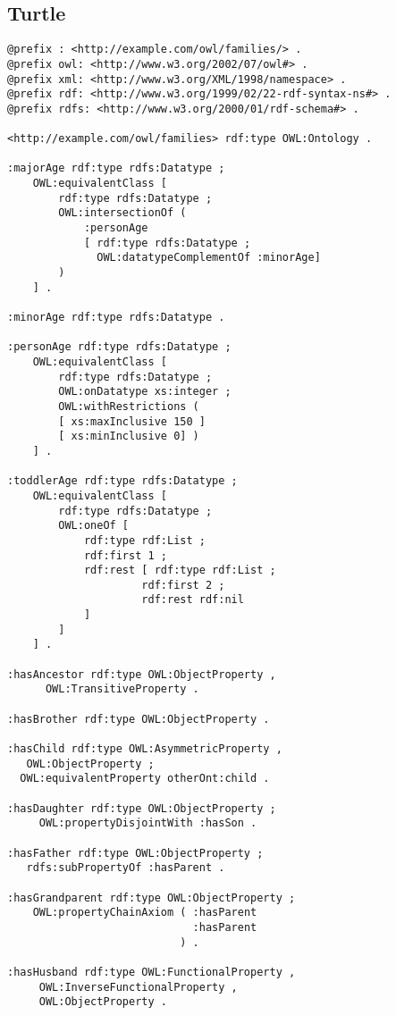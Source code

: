\documentclass[11pt,a4paper,final,oneside,onecolumn]{article}
\begin{document}
	\subsection{Turtle}
	
	
	\begin{lstlisting}[language=Turtle]
@prefix : <http://example.com/owl/families/> .
@prefix owl: <http://www.w3.org/2002/07/owl#> .
@prefix xml: <http://www.w3.org/XML/1998/namespace> .
@prefix rdf: <http://www.w3.org/1999/02/22-rdf-syntax-ns#> .
@prefix rdfs: <http://www.w3.org/2000/01/rdf-schema#> .

<http://example.com/owl/families> rdf:type OWL:Ontology .

:majorAge rdf:type rdfs:Datatype ;
    OWL:equivalentClass [ 
        rdf:type rdfs:Datatype ;
        OWL:intersectionOf ( 
            :personAge
            [ rdf:type rdfs:Datatype ;
              OWL:datatypeComplementOf :minorAge]
        )
    ] .

:minorAge rdf:type rdfs:Datatype .

:personAge rdf:type rdfs:Datatype ;
    OWL:equivalentClass [ 
        rdf:type rdfs:Datatype ;
        OWL:onDatatype xs:integer ;
        OWL:withRestrictions ( 
        [ xs:maxInclusive 150 ]
        [ xs:minInclusive 0] )
    ] .

:toddlerAge rdf:type rdfs:Datatype ;
    OWL:equivalentClass [ 
        rdf:type rdfs:Datatype ;
        OWL:oneOf [ 
            rdf:type rdf:List ;
            rdf:first 1 ;
            rdf:rest [ rdf:type rdf:List ;
                     rdf:first 2 ;
                     rdf:rest rdf:nil
            ]
        ]   
    ] .

:hasAncestor rdf:type OWL:ObjectProperty ,
      OWL:TransitiveProperty .

:hasBrother rdf:type OWL:ObjectProperty .

:hasChild rdf:type OWL:AsymmetricProperty ,
   OWL:ObjectProperty ;
  OWL:equivalentProperty otherOnt:child .

:hasDaughter rdf:type OWL:ObjectProperty ;
     OWL:propertyDisjointWith :hasSon .

:hasFather rdf:type OWL:ObjectProperty ;
   rdfs:subPropertyOf :hasParent .

:hasGrandparent rdf:type OWL:ObjectProperty ;
    OWL:propertyChainAxiom ( :hasParent
                             :hasParent
                           ) .

:hasHusband rdf:type OWL:FunctionalProperty ,
     OWL:InverseFunctionalProperty ,
     OWL:ObjectProperty .


\end{lstlisting}
\end{document}
